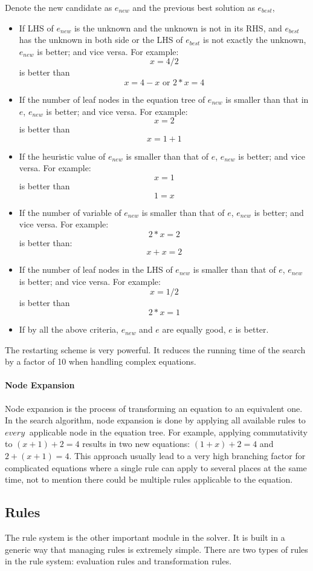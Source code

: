 \documentclass{article}
\begin{document}
Denote the new candidate as $e_{new}$ and the previous best solution as $e_{best}$,
\begin{itemize}
\item If LHS of $e_{new}$ is the unknown and the unknown is not in its RHS, and $e_{best}$ has the unknown in both side or the LHS of $e_{best}$ is not exactly the unknown, $e_{new}$ is better; and vice versa. For example:
\[x=4/2\]
is better than
\[x=4-x\text{~or~}2*x=4\] 
\item If the number of leaf nodes in the equation tree of $e_{new}$ is smaller than that in $e$, $e_{new}$ is better; and vice versa. For example:
\[x=2\]
is better than
\[x=1+1\]
\item If the heuristic value of $e_{new}$ is smaller than that of $e$, $e_{new}$ is better; and vice versa. For example:
\[x=1\]
is better than
\[1=x\]
\item If the number of variable of $e_{new}$ is smaller than that of $e$, $e_{new}$ is better; and vice versa. For example:
\[2*x = 2\]
is better than:
\[x + x = 2\]
\item If the number of leaf nodes in the LHS of $e_{new}$ is smaller than that of $e$, $e_{new}$ is better; and vice versa. For example:
\[x = 1/2\]
is better than
\[2*x = 1\]
\item If by all the above criteria, $e_{new}$ and $e$ are equally good, $e$ is better.
\end{itemize}

The restarting scheme is very powerful. It reduces the running time of the search by a factor of 10 when handling complex equations.

\paragraph{Node Expansion} Node expansion is the process of transforming an equation to an equivalent one. In the search algorithm, node expansion is done by applying all available rules to $every~$ applicable node in the equation tree. For example, applying commutativity to $(x+1)+2=4$ results in two new equations: $(1+x)+2=4$ and $2+(x+1)=4$. This approach usually lead to a very high branching factor for complicated equations where a single rule can apply to several places at the same time, not to mention there could be multiple rules applicable to the equation.

\subsection{Rules}
The rule system is the other important module in the solver. It is built in a generic way that managing rules is extremely simple. There are two types of rules in the rule system: evaluation rules and transformation rules. 
\end{document}
